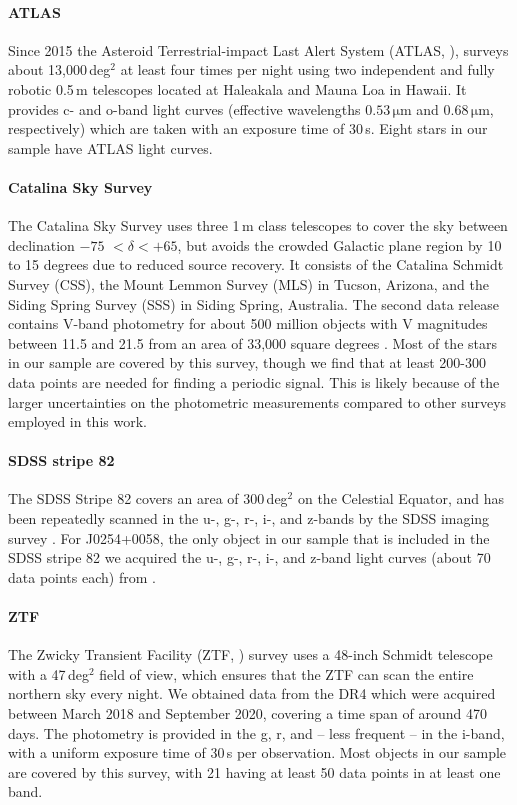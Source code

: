 \documentclass{aa}
\begin{document}
\paragraph{ATLAS}
Since 2015 the Asteroid Terrestrial-impact Last Alert System (ATLAS,
\citealt{Tonry+2018}), surveys about 13,000\,deg$^2$ at least
four times per night using two independent and fully robotic 0.5\,m telescopes
located at Haleakala and Mauna Loa in Hawaii. It provides c- and o-band light curves
(effective wavelengths $0.53\,\mathrm{\mu m}$ and $0.68\,\mathrm{\mu m}$,
respectively) which are taken with an exposure time of 30\,s.
Eight stars in our sample have ATLAS light curves.
\paragraph{Catalina Sky Survey}
The Catalina Sky Survey uses three 1\,m class
telescopes to cover the sky between declination $-75$\textdegree
$< \delta < +65$\textdegree, but avoids the crowded Galactic plane region
by 10 to 15 degrees due to reduced source recovery. It consists of the
Catalina Schmidt Survey (CSS), the Mount Lemmon Survey (MLS) in Tucson,
Arizona, and the Siding Spring Survey (SSS) in Siding Spring, Australia.
The second data release contains V-band photometry for about 500 million
objects with V magnitudes between 11.5
and 21.5 from an area of 33,000 square degrees \citep{Drake+2009, Drake+2014}.
Most of the stars in our sample are covered by this survey, though
we find that at least 200-300 data points are needed for finding
a periodic signal. This is likely because of the larger uncertainties
on the photometric measurements compared to other surveys employed in
this work.
\paragraph{SDSS stripe 82}
The SDSS Stripe 82 covers an area of 300\,deg$^2$ on the Celestial
Equator, and has been repeatedly scanned in the u-, g-, r-, i-, and z-bands
by the SDSS imaging survey \citep{Abazajian+2009}. For J0254+0058, the only object
in our sample that is included in the SDSS stripe 82  we acquired the
u-, g-, r-, i-, and z-band light curves (about 70 data points each)
from \cite{Ivezic+2007}.
\paragraph{ZTF}
The Zwicky Transient Facility (ZTF, \citealt{Bellm+2019, Masci+2019}) survey
uses a 48-inch Schmidt telescope with a 47\,deg$^2$ field of view, which
ensures that the ZTF can scan the entire northern sky every night.
We obtained data from the DR4 which were acquired between March 2018 and
September 2020, covering a time span of around 470 days. The photometry is
provided in the g, r, and -- less frequent -- in the i-band, with a uniform
exposure time of 30\,s per observation. Most objects in our sample are
covered by this survey, with 21 having at least 50 data points in at
least one band.
\end{document}
